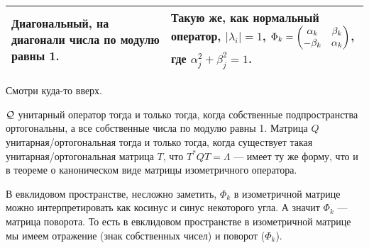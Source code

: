 \documentclass{article}
\begin{document}
\begin{itemize}
\begin{center}
\begin{tabular}{|m{}|m{}|}
                \hline
                Диагональный, на диагонали числа по модулю равны 1. & Такую же, как нормальный оператор, $|\lambda_i|=1$, $\Phi_k=\left(\begin{matrix}\alpha_k & \beta_k\\-\beta_k & \alpha_k\end{matrix}\right)$, где $\alpha_j^2+\beta_j^2=1$.\\
                \hline
            \end{tabular}
        \end{center}
        \begin{Proof}
            Смотри куда-то вверх.
        \end{Proof}
        \thm ${\mathcal{Q}}$ унитарный оператор тогда и только тогда, когда собственные подпространства ортогональны, а все собственные числа по модулю равны 1.
        \thm Матрица $Q$ унитарная/ортогональная тогда и только тогда, когда существует такая унитарная/ортогональная матрица $T$, что $T^*QT=\Lambda$ --- имеет ту же форму, что и в теореме о каноническом виде матрицы изометричного оператора.
        \begin{Comment}
            В евклидовом пространстве, несложно заметить, $\Phi_k$ в изометричной матрице можно интерпретировать как косинус и синус некоторого угла. А значит $\Phi_k$ --- матрица поворота. То есть в евклидовом пространстве в изометричной матрице мы имеем отражение (знак собственных чисел) и поворот ($\Phi_k$).
        \end{Comment}
    \end{itemize}
\end{document}
